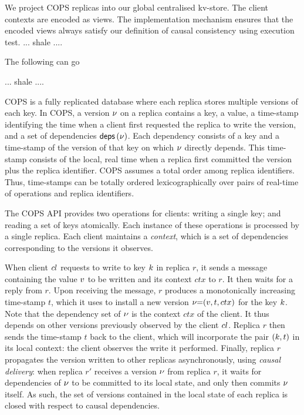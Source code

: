 We project COPS replicas into our global centralised kv-store.
The client contexts are encoded as views.
The implementation mechanism ensures that the encoded views always satisfy
our definition of causal consistency using execution test.
... shale ....

The following can go

... shale ....


COPS is a fully replicated database where  each replica stores multiple versions of each key. 
In COPS, a version \( \nu \) on a replica contains a key, a value, a
time-stamp identifying the time when a client first requested the
replica to write the version, and a set of dependencies
$\depOf[\ver]$.  Each dependency consists of a key and a time-stamp of
the version of that key on which $\nu$ directly depends.  This
 time-stamp consists of the local, real time when a replica
first committed the version plus the replica identifier. COPS assumes
a total order among replica identifiers. Thus,  time-stamps can be
totally ordered lexicographically over pairs of real-time of
operations and replica identifiers.

The COPS API provides two operations for  clients: writing a single
key; and reading 
a set of keys atomically. Each instance of these operations is processed by a single replica. 
Each client maintains a \emph{context}, which is a set of dependencies
corresponding to the versions it observes.  

When client ${cl}$ requests to write to key $k$ in replica $r$, it
sends a message containing the value $v$ to be written and its
context $ctx$ to $r$. It then waits for a reply from $r$. 
Upon receiving the message, $r$ produces a monotonically increasing time-stamp $t$, which it uses to install a new version $\nu {=} (v, t, ctx)$ for the key $k$. 
Note that the dependency set of $\nu$ is the context $ctx$ of the client.
It thus  depends on other versions previously observed by the client ${cl}$. 
Replica $r$ then sends the time-stamp $t$ back to the client, which will incorporate the pair $(k, t)$ in its local context: 
the client observes the write it performed. Finally, replica $r$ propagates the version written to other replicas asynchronously, 
using \emph{causal delivery}: when replica $r'$ receives a version $\nu$ from replica $r$, it 
waits for dependencies of $\nu$ to be committed to its local state, and only then commits $\nu$ itself.
As such, the set of versions contained in the local state of each replica is closed with respect to causal dependencies.

